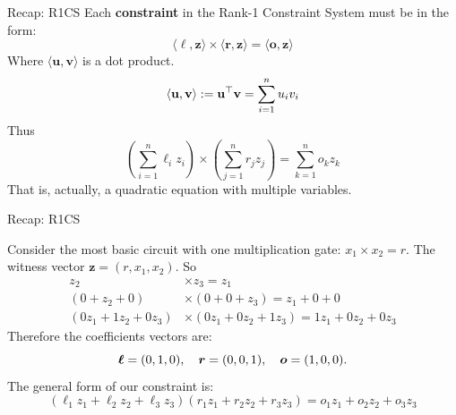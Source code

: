 \documentclass{zkdl-presentation-template}
\begin{document}
    \begin{frame}{Recap: R1CS}
        Each \textbf{constraint} in the Rank-1 Constraint System must be in the form:
        \begin{equation*}
            \langle \boldsymbol{\ell}, \mathbf{z}\rangle \times \langle \boldsymbol{r}, \mathbf{z}\rangle = \langle \boldsymbol{o}, \mathbf{z}\rangle
        \end{equation*}
        \pause
        Where $\langle \mathbf{u}, \mathbf{v}\rangle$ is a dot product.
        \vspace{-10pt}
        \begin{equation*}
            \langle \mathbf{u}, \mathbf{v} \rangle := \mathbf{u}^{\top}\mathbf{v} = \sum_{i=1}^{n} u_i v_i
            \vspace{-5pt}
        \end{equation*}
        \pause
        Thus
        \vspace{-5pt}
        \begin{equation*}
            \left(\sum_{i=1}^{n} \ell_i z_i\right) \times \left(\sum_{j=1}^{n} r_j z_j\right) = \sum_{k=1}^{n} o_k z_k
        \end{equation*}
        That is, actually, a quadratic equation with multiple variables.
    \end{frame}

    \begin{frame}{Recap: R1CS}
        \begin{example}
            Consider the most basic circuit with one multiplication gate: $x_1 \times x_2 = r$.
            The witness vector $\mathbf{z} = (r, x_1, x_2)$. So
            \vspace{-5pt}
            \begin{align*}
                z_2 &\times z_3 = z_1 \\
                (0 + z_2 + 0) &\times (0 + 0 + z_3) = z_1 + 0 + 0 \\
                (0z_1 + 1z_2 + 0z_3) &\times (0z_1 + 0z_2 + 1z_3) = 1z_1 + 0z_2 + 0z_3
            \end{align*}
            \pause
            Therefore the coefficients vectors are:
            \vspace{-5pt}
            \begin{equation*}
                \boldsymbol{\ell} = (0, 1, 0), \quad \boldsymbol{r} = (0, 0, 1), \quad \boldsymbol{o} = (1, 0, 0).
                \vspace{-5pt}
            \end{equation*}
            \pause
            The general form of our constraint is:
            \vspace{-5pt}
            \begin{equation*}
                (\ell_1z_1 + \ell_2z_2 + \ell_3z_3)(r_1z_1 + r_2z_2 + r_3z_3) = o_1z_1 + o_2z_2 + o_3z_3
            \end{equation*}
        \end{example}
    \end{frame}
\end{document}
